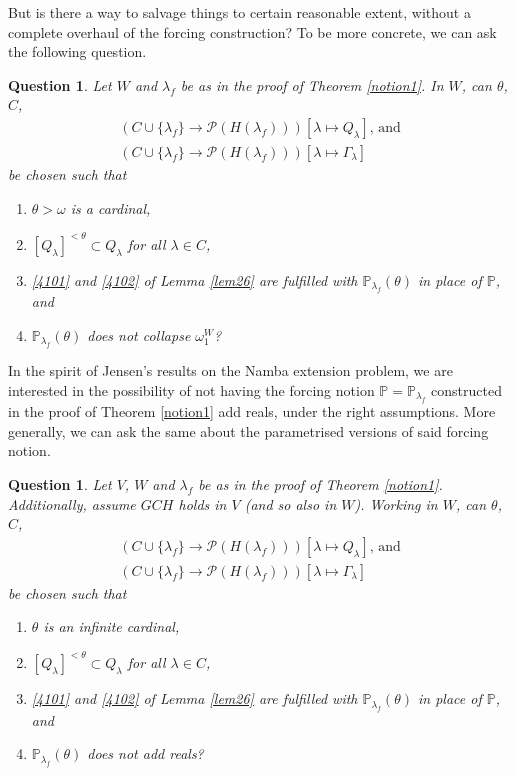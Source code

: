 \documentclass[12pt, twoside]{memoir}
\numberwithin{equation}{section}
\newtheorem{ques}[thm]{Question}
\theoremstyle{definition}
\theoremstyle{remark}
\theoremstyle{definition}
\theoremstyle{definition}
\theoremstyle{definition}
\theoremstyle{remark}
\begin{document}
But is there a way to salvage things to certain reasonable extent, without a complete overhaul of the forcing construction? To be more concrete, we can ask the following question.

\begin{ques}\label{oq1}
Let $W$ and $\lambda_f$ be as in the proof of Theorem \ref{notion1}. In $W$, can $\theta$, $C$, 
\begin{gather*}
    (C \cup \{\lambda_f\} \longrightarrow \mathcal{P}(H(\lambda_f))) [\lambda \mapsto Q_{\lambda}] \text{, and} \\
    (C \cup \{\lambda_f\} \longrightarrow \mathcal{P}(H(\lambda_f))) [\lambda \mapsto \Gamma_{\lambda}]
\end{gather*}
be chosen such that 
\begin{enumerate}[label=(\arabic*)]
    \item $\theta > \omega$ is a cardinal,
    \item $[Q_{\lambda}]^{< \theta} \subset Q_{\lambda}$ for all $\lambda \in C$,
    \item \ref{4101} and \ref{4102} of Lemma \ref{lem26} are fulfilled with $\mathbb{P}_{\lambda_f}(\theta)$ in place of $\mathbb{P}$, and
    \item $\mathbb{P}_{\lambda_f}(\theta)$ does not collapse $\omega_1^W$?
\end{enumerate}
\end{ques}

In the spirit of Jensen's results on the Namba extension problem, we are interested in the possibility of not having the forcing notion $\mathbb{P} = \mathbb{P}_{\lambda_f}$ constructed in the proof of Theorem \ref{notion1} add reals, under the right assumptions. More generally, we can ask the same about the parametrised versions of said forcing notion. 

\begin{ques}\label{addsreals}
Let $V$, $W$ and $\lambda_f$ be as in the proof of Theorem \ref{notion1}. Additionally, assume $GCH$ holds in $V$ (and so also in $W$). Working in $W$, can $\theta$, $C$, 
\begin{gather*}
    (C \cup \{\lambda_f\} \longrightarrow \mathcal{P}(H(\lambda_f))) [\lambda \mapsto Q_{\lambda}] \text{, and} \\
    (C \cup \{\lambda_f\} \longrightarrow \mathcal{P}(H(\lambda_f))) [\lambda \mapsto \Gamma_{\lambda}]
\end{gather*}
be chosen such that
\begin{enumerate}[label=(\arabic*)]
    \item $\theta$ is an infinite cardinal,
    \item $[Q_{\lambda}]^{< \theta} \subset Q_{\lambda}$ for all $\lambda \in C$,
    \item  \ref{4101} and \ref{4102} of Lemma \ref{lem26} are fulfilled with $\mathbb{P}_{\lambda_f}(\theta)$ in place of $\mathbb{P}$, and
    \item $\mathbb{P}_{\lambda_f}(\theta)$ does not add reals?
\end{enumerate}
\end{ques}
\end{document}
